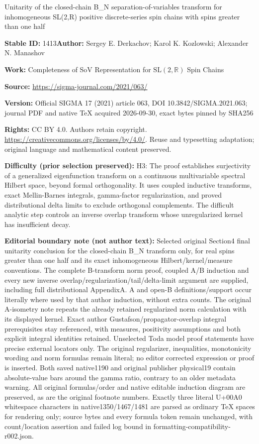 \documentclass[11pt]{article}
\numberwithin{equation}{section}
\numberwithin{equation}{section}
\begin{document}
\begin{center}\Large Unitarity of the closed-chain B\_N separation-of-variables transform for inhomogeneous SL(2,R) positive discrete-series spin chains with spins greater than one half\end{center}
\noindent\textbf{Stable ID:} 1413\quad\textbf{Author:} Sergey E. Derkachov; Karol K. Kozlowski; Alexander N. Manashov\par
\noindent\textbf{Work:} Completeness of SoV Representation for $\mathrm{SL}(2,\mathbb R)$ Spin Chains\par
\noindent\textbf{Source:} \url{https://sigma-journal.com/2021/063/}\par
\noindent\textbf{Version:} Official SIGMA 17 (2021) article 063, DOI 10.3842/SIGMA.2021.063; journal PDF and native TeX acquired 2026-09-30, exact bytes pinned by SHA256\par
\noindent\textbf{Rights:} CC BY 4.0. Authors retain copyright. \url{https://creativecommons.org/licenses/by/4.0/}. Reuse and typesetting adaptation; original language and mathematical content preserved.\par
\noindent\textbf{Difficulty (prior selection preserved):} {\CJKfont H3: The proof establishes surjectivity of a generalized eigenfunction transform on a continuous multivariable spectral Hilbert space, beyond formal orthogonality. It uses coupled inductive transforms, exact Mellin-Barnes integrals, gamma-factor regularization, and proved distributional delta limits to exclude orthogonal complements. The difficult analytic step controls an inverse overlap transform whose unregularized kernel has insufficient decay.}\par
\medskip\noindent\textbf{Editorial boundary note (not author text):} Selected original Section4 final unitarity conclusion for the closed-chain B\_N transform only, for real spins greater than one half and its exact inhomogeneous Hilbert/kernel/measure conventions. The complete B-transform norm proof, coupled A/B induction and every new inverse overlap/regularization/tail/delta-limit argument are supplied, including full distributional AppendixA. A and open-B definitions/support occur literally where used by that author induction, without extra counts. The original A-isometry note repeats the already retained regularized norm calculation with its displayed kernel. Exact author Gustafson/propagator-overlap integral prerequisites stay referenced, with measures, positivity assumptions and both explicit integral identities retained. Unselected Toda model proof statements have precise external locators only. The original regularizer, inequalities, monotonicity wording and norm formulas remain literal; no editor corrected expression or proof is inserted. Both saved native1190 and original publisher physical19 contain absolute-value bars around the gamma ratio, contrary to an older metadata warning. All original formulas/order and native editable induction diagram are preserved, as are the original footnote numbers. Exactly three literal U+00A0 whitespace characters in native1350/1467/1481 are parsed as ordinary TeX spaces for rendering only; source bytes and every formula token remain unchanged, with count/location assertion and failed log bound in formatting-compatibility-r002.json.\par
\end{document}
